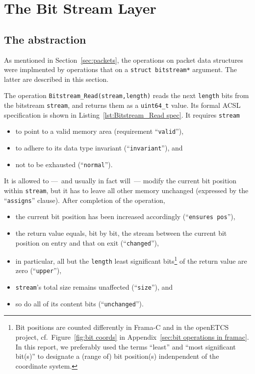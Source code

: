 

\FloatBarrier

\chapter{The Bit Stream Layer}
\label{cha:bitstream}









\section{The  abstraction}
\label{sec:bitstream}

As mentioned in Section~\ref{sec:packets},
the operations on packet data structures were implmented by 
operations that on a \lstinline{struct bitstream*} argument.
%
The latter are described in this section.

The operation 
\lstinline{Bitstream_Read(stream,length)}
reads the next \lstinline{length} bits from the bitstream
\lstinline{stream}, and returns them as a \lstinline{uint64_t} value.
%
Its formal ACSL specification is shown in 
Listing~\ref{lst:Bitstream_Read spec}.
%
It requires \lstinline{stream}
%
\begin{itemize}
\item to point to a valid memory area 
	(requirement ``\lstinline{valid}''),
\item to adhere to its data type invariant
	(``\lstinline{invariant}''), and
\item not to be exhausted (``\lstinline{normal}'').
\end{itemize}
%
It is allowed to ---~and usually in fact will~--- modify the current bit
position within \lstinline{stream}, but it has to leave all other memory
unchanged (expressed by the ``\lstinline{assigns}'' clause).
%
After completion of the operation, 
%
\begin{itemize}
\item the current bit position has been increased accordingly
	(``\lstinline{ensures pos}''),
\item the return value equals, bit by bit, the stream between the
	current bit position on entry and that on exit
	(``\lstinline{changed}''),
\item in particular, all but the \lstinline{length} least significant
	bits\footnote{
		Bit positions are counted differently in Frama-C and in
		the openETCS project, cf.\
		Figure~\ref{fig:bit coords} 
		in Appendix~\ref{sec:bit operations in framac}.
		In this report, we preferably used the terms ``least''
		and ``most significant bit(s)'' to
		designate a (range of) bit position(s) indenpendent of
		the coordinate system.
	}
	of the return value are zero
	(``\lstinline{upper}''),
\item \lstinline{stream}'s total size remains unaffected
	(``\lstinline{size}''), and
\item so do all of its content bits
	(``\lstinline{unchanged}'').
\end{itemize}



